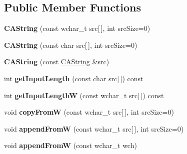 \subsection*{Public Member Functions}
\begin{DoxyCompactItemize}
\item 
\hypertarget{classps_1_1base_1_1CAString_a0379a45cc9d7af8b05fcd0f89d919dfb}{}{\bfseries C\+A\+String} (const wchar\+\_\+t src\mbox{[}$\,$\mbox{]}, int src\+Size=0)\label{classps_1_1base_1_1CAString_a0379a45cc9d7af8b05fcd0f89d919dfb}

\item 
\hypertarget{classps_1_1base_1_1CAString_a86cd1efd75f0c634e0e770225b857651}{}{\bfseries C\+A\+String} (const char src\mbox{[}$\,$\mbox{]}, int src\+Size=0)\label{classps_1_1base_1_1CAString_a86cd1efd75f0c634e0e770225b857651}

\item 
\hypertarget{classps_1_1base_1_1CAString_af1140563e7daf47ebbb118b99395da1b}{}{\bfseries C\+A\+String} (const \hyperlink{classps_1_1base_1_1CAString}{C\+A\+String} \&src)\label{classps_1_1base_1_1CAString_af1140563e7daf47ebbb118b99395da1b}

\item 
\hypertarget{classps_1_1base_1_1CAString_ab74f898cdf853e08618d263284588137}{}int {\bfseries get\+Input\+Length} (const char src\mbox{[}$\,$\mbox{]}) const \label{classps_1_1base_1_1CAString_ab74f898cdf853e08618d263284588137}

\item 
\hypertarget{classps_1_1base_1_1CAString_a3a7b972ebcd1f5f94dd8a4c2703a5ebc}{}int {\bfseries get\+Input\+Length\+W} (const wchar\+\_\+t src\mbox{[}$\,$\mbox{]}) const \label{classps_1_1base_1_1CAString_a3a7b972ebcd1f5f94dd8a4c2703a5ebc}

\item 
\hypertarget{classps_1_1base_1_1CAString_acba7036f62ad1d3959930a67cee62a13}{}void {\bfseries copy\+From\+W} (const wchar\+\_\+t src\mbox{[}$\,$\mbox{]}, int src\+Size=0)\label{classps_1_1base_1_1CAString_acba7036f62ad1d3959930a67cee62a13}

\item 
\hypertarget{classps_1_1base_1_1CAString_ac258c7ac6666a65dceef6311f0e6a7aa}{}void {\bfseries append\+From\+W} (const wchar\+\_\+t src\mbox{[}$\,$\mbox{]}, int src\+Size=0)\label{classps_1_1base_1_1CAString_ac258c7ac6666a65dceef6311f0e6a7aa}

\item 
\hypertarget{classps_1_1base_1_1CAString_a7b42022933d843363fb56f4a57702dd0}{}void {\bfseries append\+From\+W} (const wchar\+\_\+t wch)\label{classps_1_1base_1_1CAString_a7b42022933d843363fb56f4a57702dd0}


\end{DoxyCompactItemize}
